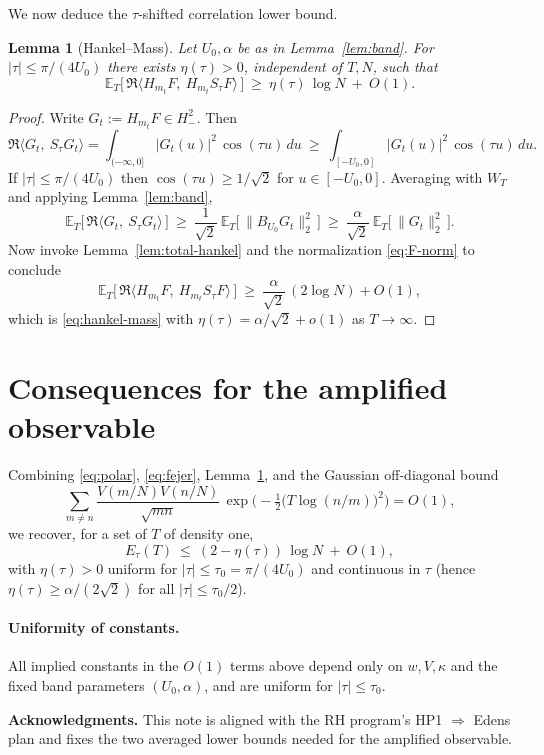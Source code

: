\documentclass[11pt]{article}
\theoremstyle{plain}
\newtheorem{lemma}[theorem]{Lemma}
\theoremstyle{definition}
\numberwithin{equation}{section}
\begin{document}
We now deduce the $\tau$-shifted correlation lower bound.

\begin{lemma}[Hankel--Mass]\label{lem:hankel-mass}
Let $U_0,\alpha$ be as in Lemma~\ref{lem:band}. For $|\tau|\le \pi/(4U_0)$ there exists $\eta(\tau)>0$, independent of $T,N$, such that
\begin{equation}\label{eq:hankel-mass}
\mathbb E_T\Big[\,\Re\langle H_{m_t}F,\ H_{m_t}S_\tau F\rangle\,\Big]\ \ge\ \eta(\tau)\,\log N\ +\ O(1).
\end{equation}
\end{lemma}

\begin{proof}
Write $G_t:=H_{m_t}F\in H^2_-$. Then
\[
\Re\langle G_t,\ S_\tau G_t\rangle
=\int_{(-\infty,0]} |G_t(u)|^2\,\cos(\tau u)\,du
\ \ge\ \int_{[-U_0,0]} |G_t(u)|^2\,\cos(\tau u)\,du.
\]
If $|\tau|\le \pi/(4U_0)$ then $\cos(\tau u)\ge 1/\sqrt{2}$ for $u\in[-U_0,0]$. Averaging with $W_T$ and applying Lemma~\ref{lem:band},
\[
\mathbb E_T\big[\,\Re\langle G_t,\ S_\tau G_t\rangle\,\big]\ \ge\ \frac{1}{\sqrt{2}}\ \mathbb E_T\big[\,\|B_{U_0}G_t\|_2^2\,\big]\ \ge\ \frac{\alpha}{\sqrt{2}}\ \mathbb E_T\big[\,\|G_t\|_2^2\,\big].
\]
Now invoke Lemma~\ref{lem:total-hankel} and the normalization \eqref{eq:F-norm} to conclude
\[
\mathbb E_T\big[\,\Re\langle H_{m_t}F,\ H_{m_t}S_\tau F\rangle\,\big]\ \ge\ \frac{\alpha}{\sqrt{2}}\,(2\log N)+O(1),
\]
which is \eqref{eq:hankel-mass} with $\eta(\tau)=\alpha/\sqrt{2}+o(1)$ as $T\to\infty$.
\end{proof}

\section{Consequences for the amplified observable}

Combining \eqref{eq:polar}, \eqref{eq:fejer}, Lemma~\ref{lem:hankel-mass}, and the Gaussian off-diagonal bound
\[
\sum_{m\neq n}\frac{V(m/N)V(n/N)}{\sqrt{mn}}\,
\exp\!\Big(-\tfrac12\big(T\log(n/m)\big)^2\Big)=O(1),
\]
we recover, for a set of $T$ of density one,
\[
E_\tau(T)\ \le\ (2-\eta(\tau))\,\log N\ +\ O(1),
\]
with $\eta(\tau)>0$ uniform for $|\tau|\le \tau_0=\pi/(4U_0)$ and continuous in $\tau$ (hence $\eta(\tau)\ge \alpha/(2\sqrt{2})$ for all $|\tau|\le\tau_0/2$).

\paragraph{Uniformity of constants.}
All implied constants in the $O(1)$ terms above depend only on $w,V,\kappa$ and the fixed band parameters $(U_0,\alpha)$, and are uniform for $|\tau|\le\tau_0$.

\bigskip

\noindent\textbf{Acknowledgments.} This note is aligned with the RH program’s HP1 $\Rightarrow$ Edens plan and fixes the two averaged lower bounds needed for the amplified observable.
\end{document}
